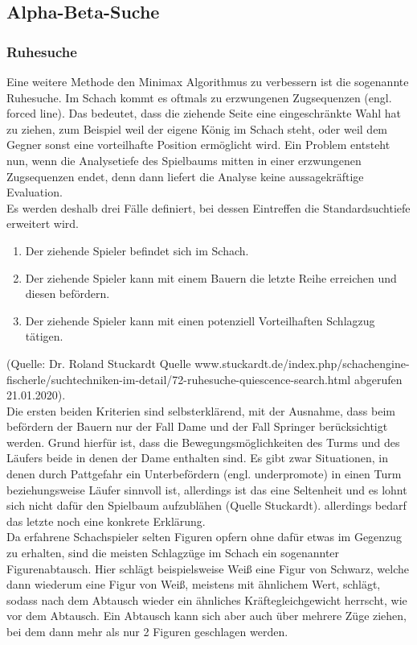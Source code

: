 \subsection{Alpha-Beta-Suche}

\subsubsection{Ruhesuche}
Eine weitere Methode den Minimax Algorithmus zu verbessern ist die sogenannte Ruhesuche. Im Schach kommt es oftmals zu erzwungenen Zugsequenzen (engl. forced line). Das bedeutet, dass die ziehende Seite eine eingeschränkte Wahl hat zu ziehen, zum Beispiel weil der eigene König im Schach steht, oder weil dem Gegner sonst eine vorteilhafte Position ermöglicht wird. Ein Problem entsteht nun, wenn die Analysetiefe des Spielbaums mitten in einer erzwungenen Zugsequenzen endet, denn dann liefert die Analyse keine aussagekräftige Evaluation.\\
Es werden deshalb drei Fälle definiert, bei dessen Eintreffen die Standardsuchtiefe erweitert wird.
\begin{enumerate}
    \item Der ziehende Spieler befindet sich im Schach.
    \item Der ziehende Spieler kann mit einem Bauern die letzte Reihe erreichen und diesen befördern.
    \item Der ziehende Spieler kann mit einen potenziell Vorteilhaften Schlagzug tätigen.
\end{enumerate}
(Quelle: Dr. Roland Stuckardt Quelle www.stuckardt.de/index.php/schachengine-fischerle/suchtechniken-im-detail/72-ruhesuche-quiescence-search.html abgerufen 21.01.2020).\\
Die ersten beiden Kriterien sind selbsterklärend, mit der Ausnahme, dass beim befördern der Bauern nur der Fall Dame und der Fall Springer berücksichtigt werden. Grund hierfür ist, dass die Bewegungsmöglichkeiten des Turms und des Läufers beide in denen der Dame enthalten sind. Es gibt zwar Situationen, in denen durch Pattgefahr ein Unterbefördern (engl. underpromote) in einen Turm beziehungsweise Läufer sinnvoll ist, allerdings ist das eine Seltenheit und es lohnt sich nicht dafür den Spielbaum aufzublähen (Quelle Stuckardt).
allerdings bedarf das letzte noch eine konkrete Erklärung.\\
Da erfahrene Schachspieler selten Figuren opfern ohne dafür etwas im Gegenzug zu erhalten, sind die meisten Schlagzüge im Schach ein sogenannter Figurenabtausch. Hier schlägt beispielsweise Weiß eine Figur von Schwarz, welche dann wiederum eine Figur von Weiß, meistens mit ähnlichem Wert, schlägt, sodass nach dem Abtausch wieder ein ähnliches Kräftegleichgewicht herrscht, wie vor dem Abtausch. Ein Abtausch kann sich aber auch über mehrere Züge ziehen, bei dem dann mehr als nur 2 Figuren geschlagen werden.
